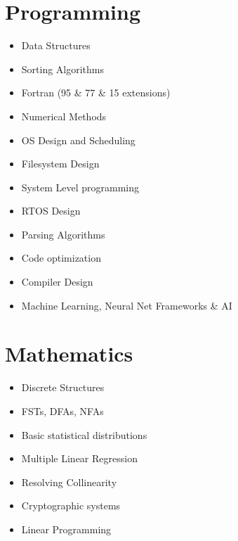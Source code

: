 \documentclass[a4paper]{article}
\begin{document}
\section{Programming}
\begin{itemize}
\item Data Structures
\item Sorting Algorithms
\item Fortran (95 \& 77 \& 15 extensions)
\item Numerical Methods
\item OS Design and Scheduling
\item Filesystem Design
\item System Level programming
\item RTOS Design
\item Parsing Algorithms
\item Code optimization
\item Compiler Design
\item Machine Learning, Neural Net Frameworks \& AI
\end{itemize}

\section{Mathematics}
\begin{itemize}
\item Discrete Structures
\item FSTs, DFAs, NFAs
\item Basic statistical distributions
\item Multiple Linear Regression
\item Resolving Collinearity
\item Cryptographic systems
\item Linear Programming
\end{itemize}

\end{document}
